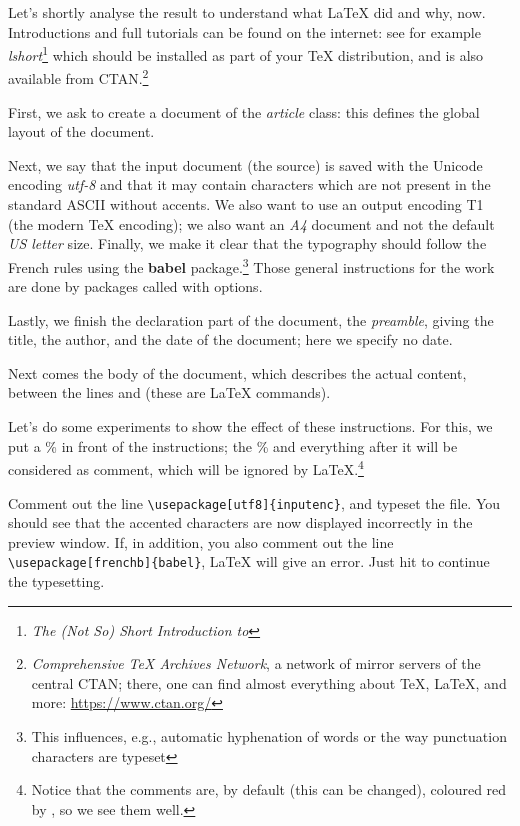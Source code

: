 Let's shortly analyse the result to understand what \LaTeX{} did and why, now. Introductions and full tutorials can be found on the internet: see for example \emph{lshort}\footnote{\emph{The (Not So) Short Introduction to \LaTeXe}} which should be installed as part of your {\TeX} distribution, and is also available from CTAN.\footnote{\emph{Comprehensive TeX Archives Network}, a network of mirror servers of the central CTAN; there, one can find almost everything about {\TeX}, {\LaTeX}, and more: \url{https://www.ctan.org/}}

First, we ask to create a document of the \emph{article} class: this defines the global layout of the document.

Next, we say that the input document (the source) is saved with the Unicode encoding \emph{utf-8} and that it may contain characters which are not present in the standard ASCII without accents. We also want to use an output encoding T1 (the modern {\TeX} encoding); we also want an \emph{A4} document and not the default \emph{US letter} size. Finally, we make it clear that the typography should follow the French rules using the \textbf{\textsf{babel}} package.\footnote{This influences, e.g., automatic hyphenation of words or the way punctuation characters are typeset} Those general instructions for the work are done by packages called with options.

Lastly, we finish the declaration part of the document, the \emph{preamble}, giving the title, the author, and the date of the document; here we specify no date.

Next comes the body of the document, which describes the actual content, between the lines \verb++ and \verb++ (these are {\LaTeX} commands).

Let's do some experiments to show the effect of these instructions. For this, we put a \% in front of the instructions; the \% and everything after it will be considered as comment, which will be ignored by {\LaTeX}.\footnote{Notice that the comments are, by default (this can be changed), coloured red by {\Tw}, so we see them well.}

Comment out the line \verb|\usepackage[utf8]{inputenc}|, and typeset the file. You should see that the accented characters are now displayed incorrectly in the preview window. If, in addition, you also comment out the line \verb|\usepackage[frenchb]{babel}|, {\LaTeX} will give an error. Just hit \Return to continue the typesetting.


